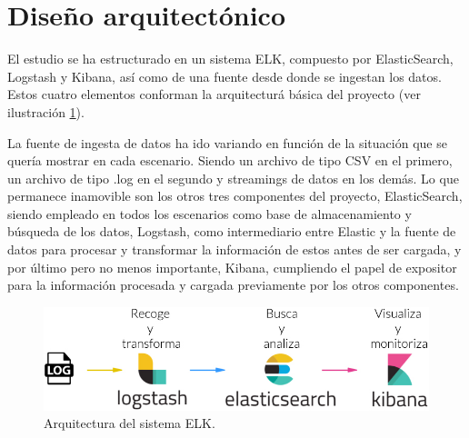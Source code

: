 \paragraph{}
\paragraph{}
\paragraph{}
\paragraph{}
\paragraph{}
\paragraph{}
\paragraph{}
\paragraph{}


\section{Diseño arquitectónico}

El estudio se ha estructurado en un sistema ELK, compuesto por ElasticSearch, Logstash y Kibana, así como de una fuente desde donde se ingestan los datos. Estos cuatro elementos conforman la arquitecturá básica del proyecto  (ver ilustración  \ref{fig:elk}).

La fuente de ingesta de datos ha ido variando en función de la situación que se quería mostrar en cada escenario. Siendo un archivo de tipo CSV en el primero, un archivo de tipo .log en el segundo y streamings de datos en los demás. Lo que permanece inamovible son los otros tres componentes del proyecto, ElasticSearch, siendo empleado en todos los escenarios como base de almacenamiento y búsqueda de los datos, Logstash, como intermediario entre Elastic y la fuente de datos para procesar y transformar la información de estos antes de ser cargada, y por último pero no menos importante, Kibana, cumpliendo el papel de expositor para la información procesada y cargada previamente por los otros componentes.

\begin{figure}
    \centering
    \includegraphics[width=1\linewidth]{img/elk.jpg}
    \caption{Arquitectura del sistema ELK.}
    \label{fig:elk}
\end{figure}

